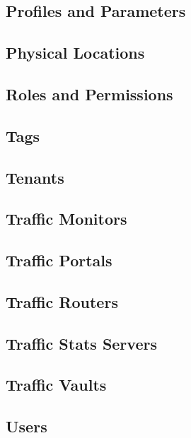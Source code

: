 \subsection{Profiles and Parameters}

\subsection{Physical Locations}

\subsection{Roles and Permissions\label{sec:roles-and-perms}}

\subsection{Tags}

\subsection{Tenants}

\subsection{Traffic Monitors}

\subsection{Traffic Portals}

\subsection{Traffic Routers}

\subsection{Traffic Stats Servers}

\subsection{Traffic Vaults}

\subsection{Users\label{sec:users}}

